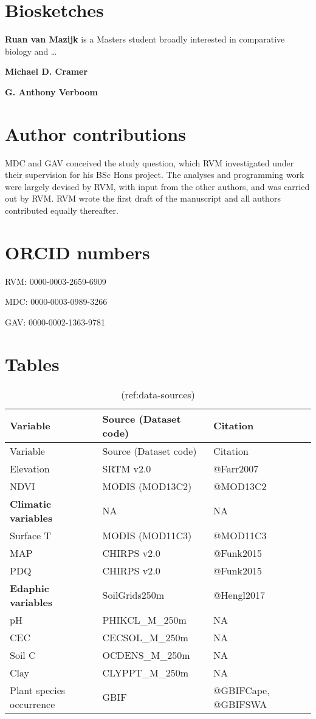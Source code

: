 \break

\hypertarget{biosketches}{%
\section*{Biosketches}\label{biosketches}}

\textbf{Ruan van Mazijk} is a Masters student broadly interested in
comparative biology and \ldots{}

\textbf{Michael D. Cramer}

\textbf{G. Anthony Verboom}

\hypertarget{author-contributions}{%
\section*{Author contributions}\label{author-contributions}}

MDC and GAV conceived the study question, which RVM investigated under
their supervision for his BSc Hons project. The analyses and programming
work were largely devised by RVM, with input from the other authors, and
was carried out by RVM. RVM wrote the first draft of the manuscript and
all authors contributed equally thereafter.

\hypertarget{orcid-numbers}{%
\section*{ORCID numbers}\label{orcid-numbers}}

RVM: 0000-0003-2659-6909

MDC: 0000-0003-0989-3266

GAV: 0000-0002-1363-9781

\break

\hypertarget{tables}{%
\section*{Tables}\label{tables}}

\begin{longtable}[]{@{}lll@{}}
\caption{(ref:data-sources)}\tabularnewline
\toprule
Variable & Source (Dataset code) & Citation\tabularnewline
\midrule
\endfirsthead
\toprule
Variable & Source (Dataset code) & Citation\tabularnewline
\midrule
\endhead
Elevation & SRTM v2.0 & @Farr2007\tabularnewline
NDVI & MODIS (MOD13C2) & @MOD13C2\tabularnewline
\textbf{Climatic variables} & NA & NA\tabularnewline
Surface T & MODIS (MOD11C3) & @MOD11C3\tabularnewline
MAP & CHIRPS v2.0 & @Funk2015\tabularnewline
PDQ & CHIRPS v2.0 & @Funk2015\tabularnewline
\textbf{Edaphic variables} & SoilGrids250m & @Hengl2017\tabularnewline
pH & PHIKCL\_M\_250m & NA\tabularnewline
CEC & CECSOL\_M\_250m & NA\tabularnewline
Soil C & OCDENS\_M\_250m & NA\tabularnewline
Clay & CLYPPT\_M\_250m & NA\tabularnewline
Plant species occurrence & GBIF & @GBIFCape, @GBIFSWA\tabularnewline
\bottomrule
\end{longtable}

